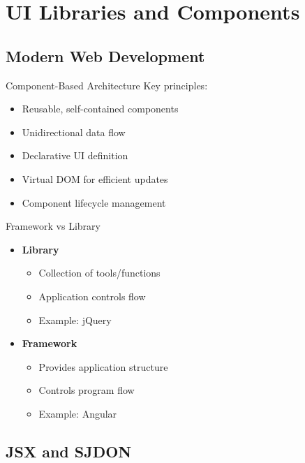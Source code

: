 \section{UI Libraries and Components}

\subsection{Modern Web Development}

\begin{concept}{Component-Based Architecture}
    Key principles:
    \begin{itemize}
        \item Reusable, self-contained components
        \item Unidirectional data flow
        \item Declarative UI definition
        \item Virtual DOM for efficient updates
        \item Component lifecycle management
    \end{itemize}
\end{concept}

\begin{definition}{Framework vs Library}
    \begin{itemize}
        \item \textbf{Library}
            \begin{itemize}
                \item Collection of tools/functions
                \item Application controls flow
                \item Example: jQuery
            \end{itemize}
        \item \textbf{Framework}
            \begin{itemize}
                \item Provides application structure
                \item Controls program flow
                \item Example: Angular
            \end{itemize}
    \end{itemize}
\end{definition}

\subsection{JSX and SJDON}

